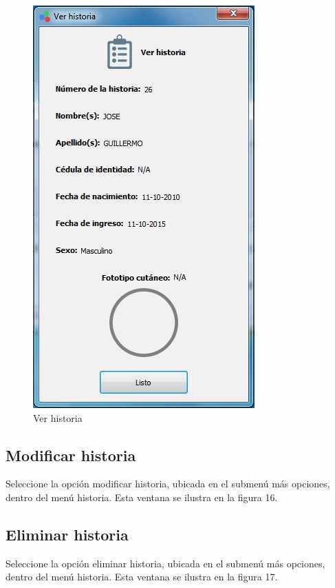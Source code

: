 \begin{figure}[H]
  \centering
  \includegraphics[width=.6\linewidth]{./img/ver-historia1.jpg}
\caption{Ver historia}
\end{figure}
		
	\subsection{Modificar historia}
	
	Seleccione la opci\'{o}n modificar historia, ubicada en el submen\'{u} m\'{a}s opciones, dentro del men\'{u} historia. Esta ventana se ilustra en la figura 16.
	
	\subsection{Eliminar historia}
	
	Seleccione la opci\'{o}n eliminar historia, ubicada en el submen\'{u} m\'{a}s opciones, dentro del men\'{u} historia. Esta ventana se ilustra en la figura 17.
	
